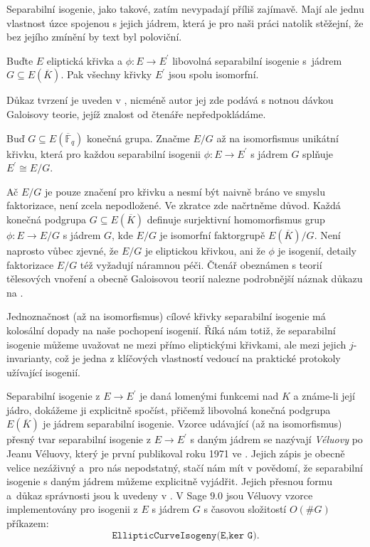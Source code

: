 \documentclass[12pt]{report}
\begin{document}
Separabilní isogenie, jako takové, zatím nevypadají příliš zajímavě. Mají ale jednu vlastnost úzce spojenou s jejich jádrem, která je pro naši práci natolik stěžejní, že bez jejího zmínění by text byl poloviční.

\begin{veta}\label{isomor}
Buďte $E$ eliptická křivka a $\phi : E \longrightarrow E^\prime$ libovolná separabilní isogenie s~jádrem $G \subseteq E(\overline{K})$. Pak všechny křivky $E^\prime$ jsou spolu isomorfní.
\end{veta}
Důkaz tvrzení je uveden v \cite[Prop. 12.12]{Washington}, nicméně autor jej zde podává s notnou dávkou Galoisovy teorie, jejíž znalost od čtenáře nepředpokládáme.

\begin{znaceni}
Buď $G \subseteq E(\overline{\mathbb{F}}_q)$ konečná grupa. Značme $E/G$ až na isomorfismus unikátní křivku, která pro každou separabilní isogenii $\phi : E \longrightarrow E^\prime$ s jádrem $G$ splňuje $E^\prime \cong E/G$.
\end{znaceni}

\begin{poznamka}
Ač $E/G$ je pouze značení pro křivku a nesmí být naivně bráno ve smyslu faktorizace, není zcela nepodložené. Ve zkratce zde načrtněme důvod. Každá konečná podgrupa $G \subseteq E(\overline{K})$ definuje surjektivní homomorfismus grup $\phi : E \longrightarrow E/G$ s jádrem $G$, kde $E/G$ je isomorfní faktorgrupě $E(\overline{K})/G$. Není naprosto vůbec zjevné, že $E/G$ je eliptickou křivkou, ani že $\phi$ je isogenií, detaily faktorizace $E/G$ též vyžadují náramnou péči. Čtenář obeznámen s teorií tělesových vnoření a obecně Galoisovou teorií nalezne podrobnější náznak důkazu na \cite[Thm. 6.10.]{Sutherland}.
\end{poznamka}

Jednoznačnost (až na isomorfismus) cílové křivky separabilní isogenie má kolosální dopady na naše pochopení isogenií. Říká nám totiž, že separabilní isogenie můžeme uvažovat ne mezi přímo eliptickými křivkami, ale mezi jejich $j$-invarianty, což je jedna z klíčových vlastností vedoucí na praktické protokoly užívající isogenií.

Separabilní isogenie z $E \longrightarrow E^\prime$ je daná lomenými funkcemi nad $K$ a známe-li její jádro, dokážeme ji explicitně spočíst, přičemž libovolná konečná podgrupa $E(\overline{K})$ je jádrem separabilní isogenie. Vzorce udávající (až na isomorfismus) přesný tvar separabilní isogenie z $E \longrightarrow E^\prime$ s daným jádrem se nazývají \textit{Véluovy} po Jeanu Véluovy, který je první publikoval roku 1971 ve \cite{Velu}. Jejich zápis je obecně velice nezáživný a~pro nás nepodstatný, stačí nám mít v povědomí, že separabilní isogenie s daným jádrem můžeme explicitně vyjádřit. Jejich přesnou formu a~důkaz správnosti jsou k uvedeny v \cite[Ch.~8.2]{DeFeo}. V Sage $9.0$ jsou Véluovy vzorce implementovány pro isogenii z $E$ s jádrem $G$ s časovou složitostí $O(\# G)$ příkazem:
\begin{equation*}
\texttt{EllipticCurveIsogeny(E,ker G)}.
\end{equation*}
\end{document}
